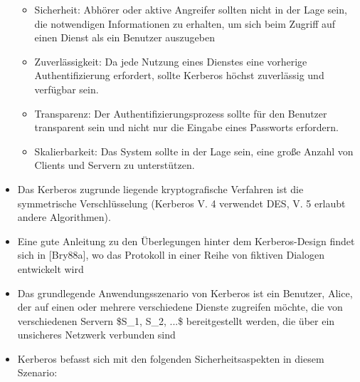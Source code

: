 \documentclass[a4paper]{article}
\begin{document}
\begin{multicols}{3}
\begin{itemize}
              \begin{itemize}
                  \item
                        Sicherheit: Abhörer oder aktive Angreifer sollten nicht in der Lage
                        sein, die notwendigen Informationen zu erhalten, um sich beim
                        Zugriff auf einen Dienst als ein Benutzer auszugeben
                  \item
                        Zuverlässigkeit: Da jede Nutzung eines Dienstes eine vorherige
                        Authentifizierung erfordert, sollte Kerberos höchst zuverlässig und
                        verfügbar sein.
                  \item
                        Transparenz: Der Authentifizierungsprozess sollte für den Benutzer
                        transparent sein und nicht nur die Eingabe eines Passworts
                        erfordern.
                  \item
                        Skalierbarkeit: Das System sollte in der Lage sein, eine große
                        Anzahl von Clients und Servern zu unterstützen.
              \end{itemize}
        \item
              Das Kerberos zugrunde liegende kryptografische Verfahren ist die
              symmetrische Verschlüsselung (Kerberos V. 4 verwendet DES, V. 5
              erlaubt andere Algorithmen).
        \item
              Eine gute Anleitung zu den Überlegungen hinter dem Kerberos-Design
              findet sich in {[}Bry88a{]}, wo das Protokoll in einer Reihe von
              fiktiven Dialogen entwickelt wird
        \item
              Das grundlegende Anwendungsszenario von Kerberos ist ein Benutzer,
              Alice, der auf einen oder mehrere verschiedene Dienste zugreifen
              möchte, die von verschiedenen Servern \$S\_1, S\_2, ...\$
              bereitgestellt werden, die über ein unsicheres Netzwerk verbunden sind
        \item
              Kerberos befasst sich mit den folgenden Sicherheitsaspekten in diesem
              Szenario:


\end{itemize}
\end{multicols}
\end{document}
